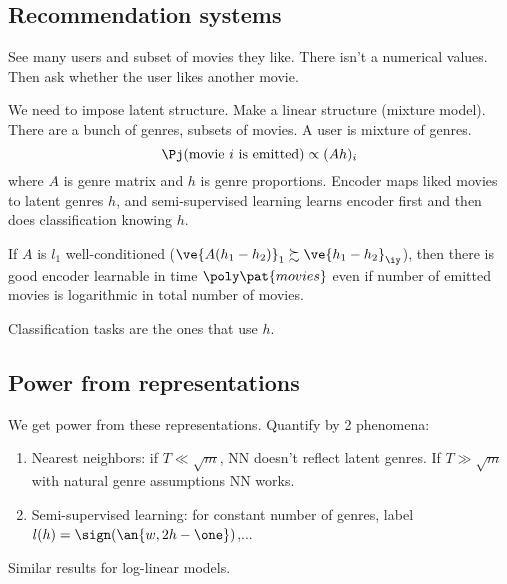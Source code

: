 \subsection{Recommendation systems}

See many users and subset of movies they like. There isn't a numerical values. Then ask whether the user likes another movie.

We need to impose latent structure. Make a linear structure (mixture model). There are a bunch of genres, subsets of movies. A  user is mixture of genres. 
$$
\Pj(\text{movie $i$ is emitted}) \propto (Ah)_i
$$
where $A$ is genre matrix and $h$ is genre proportions. Encoder maps liked movies to latent genres $h$, and semi-supervised learning learns encoder first and then does classification knowing $h$.

\begin{thm}
If $A$ is $l_1$ well-conditioned ($\ve{A(h_1-h_2)}_1\succsim \ve{h_1-h_2}_\iy$), then there is good encoder learnable in time $\poly\pat{movies}$ even if number of emitted movies is logarithmic in total number of movies.
\end{thm}
Classification tasks are the ones that use $h$.

\subsection{Power from representations}
We get power from these representations. Quantify by 2 phenomena:
\begin{enumerate}
\item
Nearest neighbors: if $T\ll \sqrt m$, NN doesn't reflect latent genres. If $T\gg \sqrt m$ with natural genre assumptions NN works.
\item
Semi-supervised learning: for constant number of genres, label $ l(h)=\sign(\an{w,2h-\one})$,...
\end{enumerate}
Similar results for log-linear models. 


